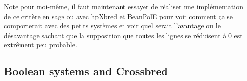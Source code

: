 \documentclass[english]{article}
\begin{document}
		 Note pour moi-même, il faut maintenant essayer de réaliser une implémentation de ce critère en sage ou avec hpXbred et BeanPolE pour voir comment ça se comporterait avec des petits systèmes et voir quel serait l'avantage ou le désavantage sachant que la supposition que toutes les lignes se réduisent à 0 est extrêment peu probable.
		 
		 \subsection{Boolean systems and Crossbred}
		 
		 
\printbibliography
\end{document}
